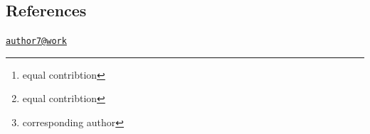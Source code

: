 \hypertarget{references}{%
\subsection{References}\label{references}}




\address{%
Rayna M Harris \footnote{equal contribtion}\\
UC Davis\\
\\
}


\address{%
Suzanne H. Austin \footnote{equal contribtion}\\
UC Davis\\
\\
}


\address{%
Andrew S. Lang\\
UNH\\
\\
}


\address{%
Victoria S. Farrar\\
UC Davis\\
\\
}


\address{%
April Booth\\
UC Davis\\
\\
}


\address{%
Tanner Feustel\\
UC Davis\\
\\
}


\address{%
Matthew D. MacManes\\
UNH\\
\\
}


\address{%
Rebecca M. Calisi \footnote{corresponding author}\\
UC Davis\\
\\
}
\href{mailto:author7@work}{\nolinkurl{author7@work}}

